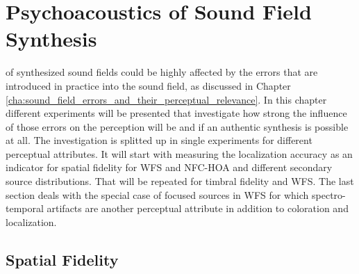 \def \GITHUB {\GITHUBBASE/05_psychoacoustics}
\graphicspath{%
{\PATH/\CHAPFIVE/fig5_01/}%
{\PATH/\CHAPFIVE/fig5_02/}%
{\PATH/\CHAPFIVE/fig5_03/}%
{\PATH/\CHAPFIVE/fig5_04/}%
{\PATH/\CHAPFIVE/fig5_05/}%
{\PATH/\CHAPFIVE/fig5_06/}%
{\PATH/\CHAPFIVE/fig5_07/}%
{\PATH/\CHAPFIVE/fig5_08/}%
{\PATH/\CHAPFIVE/fig5_09/}%
{\PATH/\CHAPFIVE/fig5_10/}%
{\PATH/\CHAPFIVE/fig5_11/}%
{\PATH/\CHAPFIVE/fig5_12/}%
{\PATH/\CHAPFIVE/fig5_13/}%
{\PATH/\CHAPFIVE/fig5_14/}%
{\PATH/\CHAPFIVE/fig5_15/}%
{\PATH/\CHAPFIVE/fig5_16/}%
{\PATH/\CHAPFIVE/fig5_17/}%
{\PATH/\CHAPFIVE/fig5_18/}%
{\PATH/\CHAPFIVE/fig5_19/}%
{\PATH/\CHAPFIVE/fig5_20/}%
{\PATH/\CHAPFIVE/fig5_21/}%
{\PATH/\CHAPFIVE/fig5_22/}%
{\PATH/\CHAPFIVE/fig5_23/}%
{\PATH/\CHAPFIVE/fig5_24/}%
{\PATH/\CHAPFIVE/fig5_25/}%
{\PATH/\CHAPFIVE/fig5_26/}%
{\PATH/\CHAPFIVE/fig5_27/}%
{\PATH/\CHAPFIVE/fig5_28/}%
{\PATH/\CHAPFIVE/fig5_29/}%
}


\chapter{Psychoacoustics of Sound Field Synthesis}
\label{cha:psychoacoustics}

 of synthesized sound fields could be highly
affected by the errors that are introduced in practice into the sound
field, as discussed in
Chapter\,\ref{cha:sound_field_errors_and_their_perceptual_relevance}.
In this chapter different experiments will be presented that investigate how
strong the influence of those errors on the perception will be and if an
authentic synthesis is possible at all. The investigation is splitted up in
single experiments for different perceptual attributes.
It will start with measuring the localization
accuracy as an indicator for spatial fidelity for \ac{WFS} and \ac{NFC-HOA} and
different secondary source distributions. That will be repeated for timbral
fidelity and \ac{WFS}.
The last section deals with the special case of focused sources in \ac{WFS} for
which spectro-temporal artifacts are another perceptual attribute in addition to
coloration and localization.


\section[Spatial Fidelity]{Spatial Fidelity\autocite[Parts of this section are published
in][]{Wierstorf2012c,Wierstorf2013}}
\label{sec:localization}

